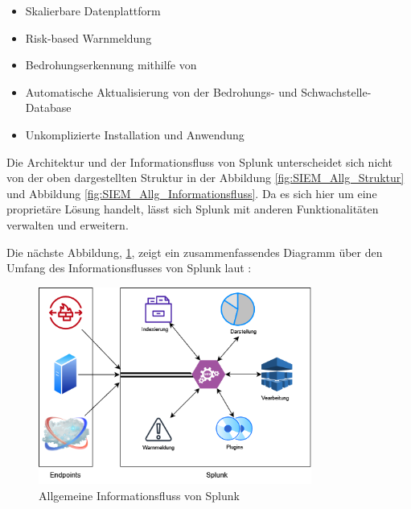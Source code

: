 \begin{itemize}[noitemsep]
   \item Skalierbare Datenplattform
   \item Risk-based Warnmeldung
   \item Bedrohungserkennung mithilfe von 
   \item Automatische Aktualisierung von der Bedrohungs- und Schwachstelle-Database
   \item Unkomplizierte Installation und Anwendung
\end{itemize}

Die Architektur und der Informationsfluss von Splunk unterscheidet sich nicht von der oben dargestellten Struktur in der Abbildung \ref{fig:SIEM_Allg_Struktur} und Abbildung \ref{fig:SIEM_Allg_Informationsfluss}. Da es sich hier um eine proprietäre Lösung handelt, lässt sich Splunk mit anderen Funktionalitäten verwalten und erweitern.

Die nächste Abbildung, \ref{fig:Allgemein_Splunk}, zeigt ein zusammenfassendes Diagramm über den Umfang des Informationsflusses von Splunk laut \cite{Splunk_platform}:


\begin{figure}[H]
   \centering
   \includegraphics[width=0.8\textwidth]{assets/Splunk.drawio.png}
   \caption[Allgemeine Informationsfluss von Splunk]
   {Allgemeine Informationsfluss von Splunk}
   \label{fig:Allgemein_Splunk}
   \centering
\end{figure}

